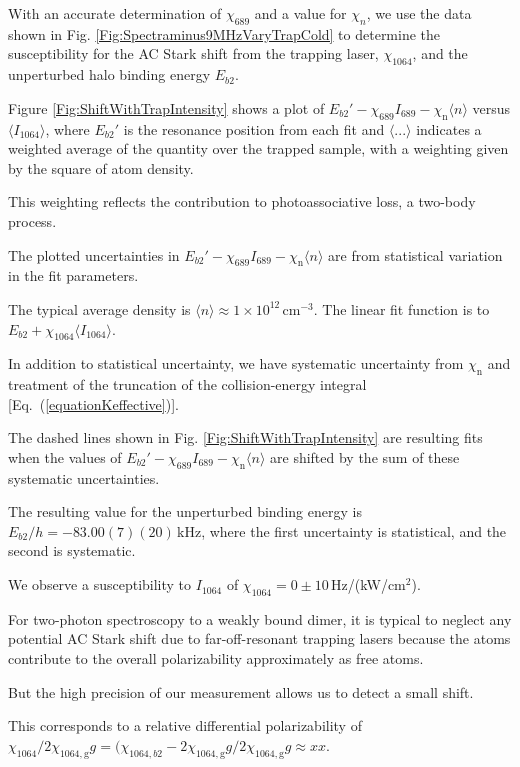 With an accurate determination of $\chi_{689}$ and a value for $\chi_n$, we use the data shown in Fig. \ref{Fig:Spectraminus9MHzVaryTrapCold} to determine the susceptibility for the AC Stark shift from the trapping laser, $\chi_{1064}$, and the unperturbed halo binding energy $E_{b2}$.

Figure \ref{Fig:ShiftWithTrapIntensity} shows a plot of $E_{b2}'-\chi_{689}I_{689} - \chi_{\text{n}}\langle n\rangle$ versus $\langle I_{1064} \rangle $, where $E_{b2}'$ is the resonance position from each fit and $\langle ... \rangle $ indicates a weighted average of the quantity over the trapped sample, with a weighting given by the square of atom density.

This weighting reflects the contribution to photoassociative loss, a two-body process.

The plotted uncertainties in $E_{b2}'-\chi_{689}I_{689} - \chi_{\text{n}}\langle n\rangle$ are from statistical variation in the fit parameters.

The typical average density is $\langle n\rangle\approx 1\times 10^{12}$\,cm$^{-3}$. The linear fit function is to $E_{b2}+\chi_{1064}\langle I_{1064} \rangle $.

In addition to statistical uncertainty, we have systematic uncertainty from $\chi_{\text{n}}$ and treatment of the truncation of the collision-energy integral [Eq.\ (\ref{equationKeffective})].

The dashed lines shown in Fig. \ref{Fig:ShiftWithTrapIntensity} are resulting fits when the values of $E_{b2}'-\chi_{689}I_{689} - \chi_{\text{n}}\langle n\rangle$ are shifted by the sum of these systematic uncertainties.

The resulting value for the unperturbed binding energy is $E_{b2}/h=-83.00(7)(20)$\,kHz, where the first uncertainty is statistical, and the second is systematic.

We observe a susceptibility to $I_{1064}$ of $\chi_{1064}=0\pm 10$\,Hz/(kW/cm$^2$).


For two-photon spectroscopy to a weakly bound dimer, it is typical to neglect any potential AC Stark shift due to far-off-resonant trapping lasers because the atoms contribute to the overall polarizability approximately as free atoms.

But the high precision of our measurement allows us to detect a small shift.

This corresponds to a relative differential polarizability of ${\chi_{1064}}/{2\chi_{1064,\text{g}}g}={(\chi_{1064,b2}-2\chi_{1064,\text{g}}g}/{2\chi_{1064,\text{g}}g}\approx xx$.








